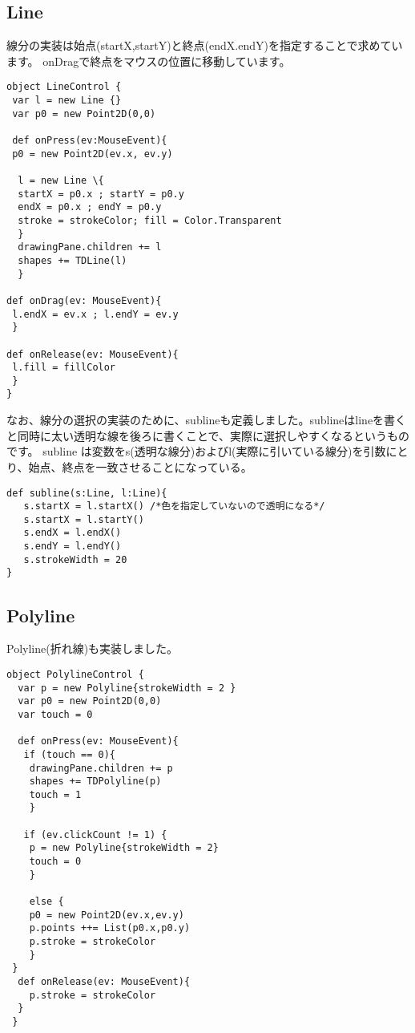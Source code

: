 \documentclass [11pt] {jsarticle}
\begin{document}
\subsection{Line}
線分の実装は始点(startX,startY)と終点(endX.endY)を指定することで求めています。
onDragで終点をマウスの位置に移動しています。\\
\begin{verbatim}
object LineControl {
 var l = new Line {}
 var p0 = new Point2D(0,0)

 def onPress(ev:MouseEvent){
 p0 = new Point2D(ev.x, ev.y)

  l = new Line \{
  startX = p0.x ; startY = p0.y
  endX = p0.x ; endY = p0.y
  stroke = strokeColor; fill = Color.Transparent
  }
  drawingPane.children += l
  shapes += TDLine(l)
  }

def onDrag(ev: MouseEvent){
 l.endX = ev.x ; l.endY = ev.y
 }

def onRelease(ev: MouseEvent){
 l.fill = fillColor
 }
}
\end{verbatim}

なお、線分の選択の実装のために、sublineも定義しました。sublineはlineを書くと同時に太い透明な線を後ろに書くことで、実際に選択しやすくなるというものです。
subline は変数をs(透明な線分)およびl(実際に引いている線分)を引数にとり、始点、終点を一致させることになっている。 \\

\begin{verbatim}
def subline(s:Line, l:Line){
   s.startX = l.startX() /*色を指定していないので透明になる*/
   s.startX = l.startY()
   s.endX = l.endX()
   s.endY = l.endY()
   s.strokeWidth = 20
}
\end{verbatim}

\subsection{Polyline}
Polyline(折れ線)も実装しました。
\begin{verbatim}
object PolylineControl {
  var p = new Polyline{strokeWidth = 2 }
  var p0 = new Point2D(0,0)
  var touch = 0

  def onPress(ev: MouseEvent){
   if (touch == 0){
    drawingPane.children += p
    shapes += TDPolyline(p)
    touch = 1
    }

   if (ev.clickCount != 1) {
    p = new Polyline{strokeWidth = 2}
    touch = 0
    }

    else {
    p0 = new Point2D(ev.x,ev.y)
    p.points ++= List(p0.x,p0.y)
    p.stroke = strokeColor
    }
 }
  def onRelease(ev: MouseEvent){
    p.stroke = strokeColor
  }
 }
\end{verbatim}
\end{document}
